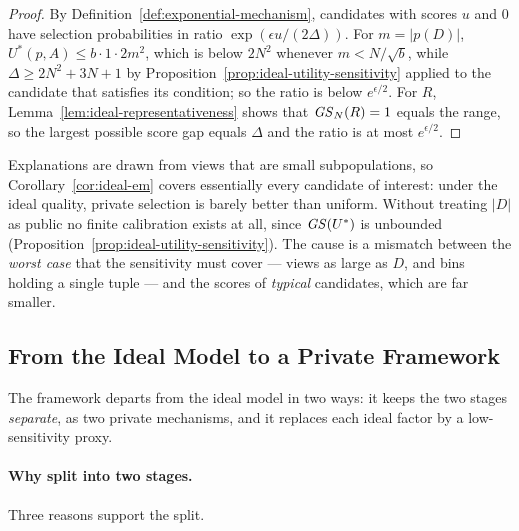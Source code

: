 \begin{proof}
By Definition~\ref{def:exponential-mechanism}, candidates with scores $u$ and $0$ have selection probabilities in ratio $\exp(\epsilon u/(2\Delta))$.
For $m=|p(D)|$, $U^*(p,A)\le b\cdot1\cdot2m^2$, which is below $2N^2$ whenever $m<N/\sqrt{b}$, while $\Delta\ge2N^2+3N+1$ by Proposition~\ref{prop:ideal-utility-sensitivity} applied to the candidate that satisfies its condition; so the ratio is below $e^{\epsilon/2}$.
For $R$, Lemma~\ref{lem:ideal-representativeness} shows that $\mathit{GS}_N(R)=1$ equals the range, so the largest possible score gap equals $\Delta$ and the ratio is at most $e^{\epsilon/2}$.
\end{proof}

Explanations are drawn from views that are small subpopulations, so Corollary~\ref{cor:ideal-em} covers essentially every candidate of interest: under the ideal quality, private selection is barely better than uniform.
Without treating $|D|$ as public no finite calibration exists at all, since $\mathit{GS}(U^*)$ is unbounded (Proposition~\ref{prop:ideal-utility-sensitivity}).
The cause is a mismatch between the \emph{worst case} that the sensitivity must cover --- views as large as $D$, and bins holding a single tuple --- and the scores of \emph{typical} candidates, which are far smaller.

\subsection{From the Ideal Model to a Private Framework}
\label{subsec:ideal-to-private}

The framework departs from the ideal model in two ways: it keeps the two stages \emph{separate}, as two private mechanisms, and it replaces each ideal factor by a low-sensitivity proxy.

\paragraph{Why split into two stages.}
Three reasons support the split.

